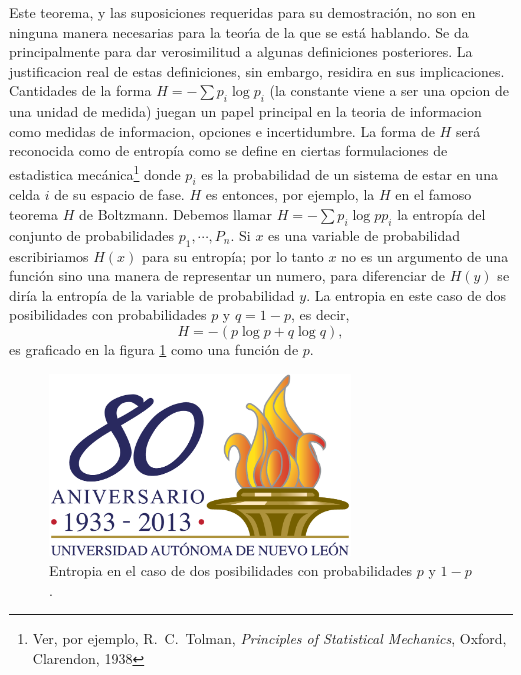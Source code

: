 Este teorema, y las suposiciones requeridas para su demostraci\'{o}n,
no son en ninguna manera necesarias para la teor\'{\i}a de la que se
est\'{a} hablando.  Se da principalmente para dar verosimilitud a
algunas definiciones posteriores. La justificacion real de estas
definiciones, sin embargo, residira en sus implicaciones. Cantidades
de la forma $H = -\sum p_{i} \log p_{i}$ (la constante viene a ser una
opcion de una unidad de medida) juegan un papel principal en la teoria
de informacion como medidas de informacion, opciones e
incertidumbre. La forma de $H$ ser\'{a} reconocida como de
entrop\'{i}a como se define en ciertas formulaciones de estadistica
mec\'{a}nica\footnote{Ver, por ejemplo, R.\ C.\ Tolman, {\em
    Principles of Statistical Mechanics}, Oxford, Clarendon, 1938}
donde $p_{i}$ es la probabilidad de un sistema de estar en una celda
$i$ de su espacio de fase. $H$ es entonces, por ejemplo, la $H$ en el
famoso teorema $H$ de Boltzmann. Debemos llamar $H = -\sum p_{i}
\log{p} p_{i}$ la entrop\'{i}a del conjunto de probabilidades $p_{1},
\cdots,P_{n}$. Si $x$ es una variable de probabilidad escribiriamos
$H(x)$ para su entrop\'{i}a; por lo tanto $x$ no es un argumento de
una funci\'{o}n sino una manera de representar un numero, para
diferenciar de $H(y)$ se dir\'{i}a la entrop\'{i}a de la variable de
probabilidad $y$.  La entropia en este caso de dos posibilidades con
probabilidades $p$ y $q = 1 - p$, es decir,
\begin{equation}
H = -(p \log p + q \log q),
\end{equation}
es graficado en la figura \ref{fig:7} como una funci\'{o}n de $p$.

\begin{figure}[!ht]
\centerline{\includegraphics[width=80mm]{ejemplo.png}}
\caption{Entropia en el caso de dos posibilidades con probabilidades
  $p$ y $1 - p$.}
\label{fig:7}
\end{figure}

